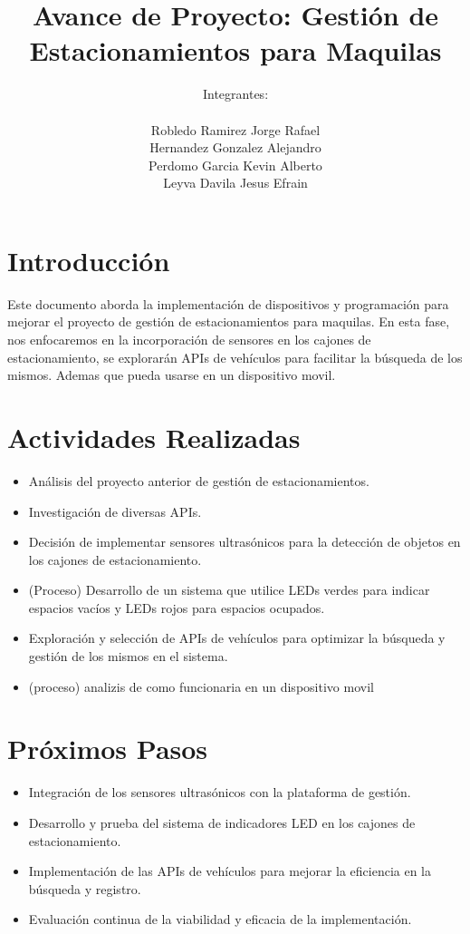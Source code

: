 \documentclass{article}
\title{Avance de Proyecto: Gestión de Estacionamientos para Maquilas}
\author{Integrantes: \\ 
  \begin{tabular}{l}
    Robledo Ramirez Jorge Rafael \\
    Hernandez Gonzalez Alejandro \\
    Perdomo Garcia Kevin Alberto \\
    Leyva Davila Jesus Efrain \\
  \end{tabular}
}
\begin{document}
\maketitle

\section{Introducción}
Este documento aborda la implementación de dispositivos y programación para mejorar el proyecto de gestión de estacionamientos para maquilas. En esta fase, nos enfocaremos en la incorporación de sensores en los cajones de estacionamiento, se explorarán APIs de vehículos para facilitar la búsqueda de los mismos. Ademas que pueda usarse en un dispositivo movil.

\section{Actividades Realizadas}
\begin{itemize}
  \item Análisis del proyecto anterior de gestión de estacionamientos.
  \item Investigación de diversas APIs.
  \item Decisión de implementar sensores ultrasónicos para la detección de objetos en los cajones de estacionamiento.
  \item (Proceso) Desarrollo de un sistema que utilice LEDs verdes para indicar espacios vacíos y LEDs rojos para espacios ocupados.
  \item Exploración y selección de APIs de vehículos para optimizar la búsqueda y gestión de los mismos en el sistema.
  \item (proceso) analizis de como funcionaria en un dispositivo movil
\end{itemize}

\section{Próximos Pasos}
\begin{itemize}
  \item Integración de los sensores ultrasónicos con la plataforma de gestión.
  \item Desarrollo y prueba del sistema de indicadores LED en los cajones de estacionamiento.
  \item Implementación de las APIs de vehículos para mejorar la eficiencia en la búsqueda y registro.
  \item Evaluación continua de la viabilidad y eficacia de la implementación.
\end{itemize}
\end{document}

